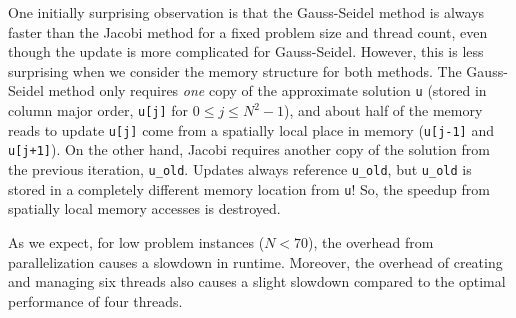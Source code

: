\begin{questions}
\begin{solution}
    One initially surprising observation is that the Gauss-Seidel method is always
    faster than the Jacobi method for a fixed problem size and thread count, even
    though the update is more complicated for Gauss-Seidel. However, this is
    less surprising when we consider the memory structure for both methods.
    The Gauss-Seidel method only requires \emph{one} copy of the approximate
    solution \texttt u (stored in column major order, \texttt{u[j]} for $0\le 
    j \le N^2-1$), and about half of the memory reads to update \texttt{u[j]} come
    from a spatially local place in memory (\texttt{u[j-1]} and \texttt{u[j+1]}).
    On the other hand, Jacobi requires another copy of the solution from the previous
    iteration, \texttt{u\_old}. Updates always reference \texttt{u\_old}, but 
    \texttt{u\_old} is stored in a completely different memory location from \texttt{u}!
    So, the speedup from spatially local memory accesses is destroyed.
    
    As we expect, for low problem instances ($N<70$), the overhead from parallelization
    causes a slowdown in runtime. Moreover, the overhead of creating and managing six threads
    also causes a slight slowdown compared to the optimal performance of four threads.
    
\end{solution}

\end{questions}